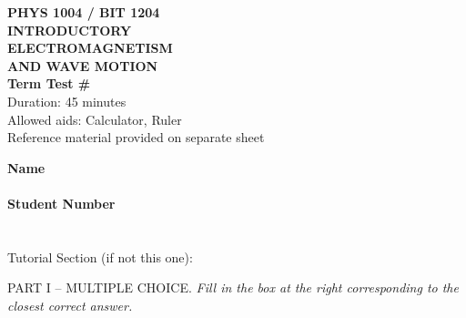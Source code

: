 \clearpage
\begin{minipage}[t]{0.5\textwidth}
\textbf{PHYS 1004 / BIT 1204 \\
INTRODUCTORY \\ 
ELECTROMAGNETISM \\
AND WAVE MOTION} \\
\textbf{Term Test \# \testNumber}  \\ %
Duration: 45 minutes \\
Allowed aids: Calculator, Ruler \\
Reference material provided on separate sheet \\
\vspace{0.2cm}
\end{minipage}
\begin{minipage}[t]{0.49\textwidth}
\textbf{Name}\hrulefill \\
\\
\textbf{Student Number}\hrulefill \\
\\
%
%
\small
\currentTutorial \\
Tutorial Section (if not this one): \hrulefill \\
\end{minipage}

PART I -- MULTIPLE CHOICE. 
\textit{Fill in the box at the right corresponding to the closest correct answer.}
